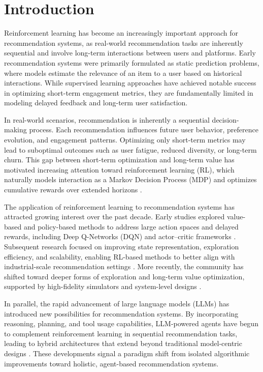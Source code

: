 \section{Introduction}

Reinforcement learning has become an increasingly important approach for recommendation systems, as real-world recommendation tasks are inherently sequential and involve long-term interactions between users and platforms. Early recommendation systems were primarily formulated as static prediction problems, where models estimate the relevance of an item to a user based on historical interactions. While supervised learning approaches have achieved notable success in optimizing short-term engagement metrics, they are fundamentally limited in modeling delayed feedback and long-term user satisfaction.

In real-world scenarios, recommendation is inherently a sequential decision-making process. Each recommendation influences future user behavior, preference evolution, and engagement patterns. Optimizing only short-term metrics may lead to suboptimal outcomes such as user fatigue, reduced diversity, or long-term churn. This gap between short-term optimization and long-term value has motivated increasing attention toward reinforcement learning (RL), which naturally models interaction as a Markov Decision Process (MDP) and optimizes cumulative rewards over extended horizons \cite{Sutton1998RL}.

The application of reinforcement learning to recommendation systems has attracted growing interest over the past decade. Early studies explored value-based and policy-based methods to address large action spaces and delayed rewards, including Deep Q-Networks (DQN) and actor–critic frameworks \cite{Zheng2018DRN,Chen2019TopK}. Subsequent research focused on improving state representation, exploration efficiency, and scalability, enabling RL-based methods to better align with industrial-scale recommendation settings \cite{Zhao2018SlateMDP}. More recently, the community has shifted toward deeper forms of exploration and long-term value optimization, supported by high-fidelity simulators and system-level designs \cite{Ie2019DeepExploration}.

In parallel, the rapid advancement of large language models (LLMs) has introduced new possibilities for recommendation systems. By incorporating reasoning, planning, and tool usage capabilities, LLM-powered agents have begun to complement reinforcement learning in sequential recommendation tasks, leading to hybrid architectures that extend beyond traditional model-centric designs \cite{Wang2024RecoMind}. These developments signal a paradigm shift from isolated algorithmic improvements toward holistic, agent-based recommendation systems.

